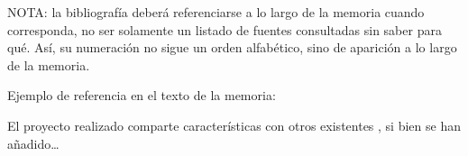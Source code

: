 \documentclass{memoriaTFG}
\begin{document}
NOTA: la bibliografía deberá referenciarse a lo largo de la memoria cuando corresponda, no ser solamente un listado de fuentes consultadas sin saber para qué. Así, su numeración no sigue un orden alfabético, sino de aparición a lo largo de la memoria.

Ejemplo de referencia en el texto de la memoria:

El proyecto realizado comparte características con otros existentes \cite{bilstrup}, si bien se han añadido\ldots
\end{document}
